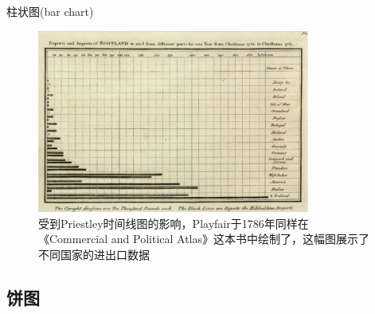 \documentclass{beamerthemeMono}
\begin{document}
\begin{frame}[c]{柱状图(bar chart)}{}

  \begin{figure}
    \centering
    \includegraphics[width=0.8\textwidth]{Playfair_barchart.jpg}
    \caption{受到Priestley时间线图的影响，Playfair于1786年同样在
      《Commercial and Political Atlas》这本书中绘制了，这幅图展示了不同国家的进出口数据}
  \end{figure}

\end{frame}

\subsection{饼图}
\end{document}
